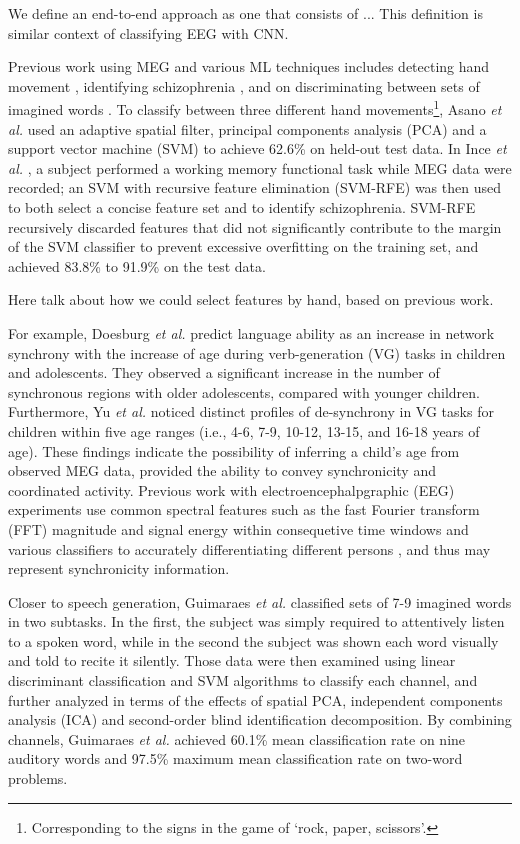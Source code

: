 \documentclass[utf8]{frontiersSCNS} %
\begin{document}
We define an end-to-end approach as one that consists of ... This definition is similar context of classifying EEG with CNN. 

Previous work using MEG and various ML techniques includes detecting hand movement \cite{Asano2009}, identifying schizophrenia \cite{Ince2008}, and on discriminating between sets of imagined words \cite{Guimaraes2007}. To classify between three different hand movements\footnote{Corresponding to the signs in the game of `rock, paper, scissors'.}, Asano {\em et al.} \cite{Asano2009} used an adaptive spatial filter, principal components analysis (PCA) and a support vector machine (SVM) to achieve 62.6\% on held-out test data. In Ince {\em et al.} \cite{Ince2008}, a subject performed a working memory functional task while MEG data were recorded; an SVM with recursive feature elimination (SVM-RFE) was then used to both select a concise feature set and to identify schizophrenia. SVM-RFE recursively discarded features that did not significantly contribute to the margin of the SVM classifier to prevent excessive overfitting on the training set, and achieved 83.8\% to 91.9\% on the test data.



Here talk about how we could select features by hand, based on previous work.

For example, Doesburg {\em et al.} \cite{Doesburg2016} predict language ability as an increase in network synchrony with the increase of age during verb-generation (VG) tasks in children and adolescents. They observed a significant increase in the number of synchronous regions with older adolescents, compared with younger children. Furthermore, Yu {\em et al.} \cite{Yu2014} noticed distinct profiles of de-synchrony in VG tasks for children within five age ranges (i.e., 4-6, 7-9, 10-12, 13-15, and 16-18 years of age). These findings indicate the possibility of inferring a child's age from observed MEG data, provided the ability to convey synchronicity and coordinated activity.
Previous work with electroencephalpgraphic (EEG) experiments use common spectral features such as the fast Fourier transform (FFT) magnitude and signal energy within consequetive time windows and various classifiers to accurately differentiating different persons \cite{Nguyen2012, Poulos2001}, and thus may represent synchronicity information.


Closer to speech generation, Guimaraes {\em et al.} \cite{Guimaraes2007} classified sets of 7-9 imagined words in two subtasks. In the first, the subject was simply required to attentively listen to a spoken word, while in the second the subject was shown each word visually and told to recite it
silently. Those data were then examined using linear discriminant classification and SVM algorithms to classify each
channel, and further analyzed in terms of the effects of spatial PCA, independent components analysis (ICA) and second-order
blind identification decomposition. By combining channels, Guimaraes {\em et al.} achieved 60.1\% mean classification
rate on nine auditory words and 97.5\% maximum mean classification rate on two-word problems.
\end{document}
